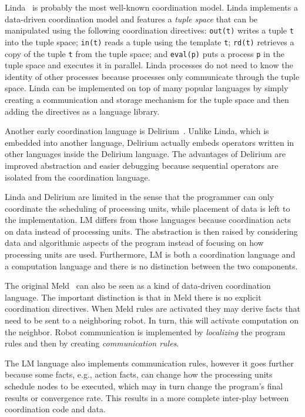 Linda~\cite{linda} is probably the most well-known coordination model. Linda
implements a data-driven coordination model and features a \emph{tuple space}
that can be manipulated using the following coordination directives:
\texttt{out(t)} writes a tuple \texttt{t} into the tuple space; \texttt{in(t)}
reads a tuple using the template \texttt{t}; \texttt{rd(t)} retrieves a copy of
the tuple \texttt{t} from the tuple space; and \texttt{eval(p)} puts a process
\texttt{p} in the tuple space and executes it in parallel.  Linda processes do
not need to know the identity of other processes because processes only
communicate through the tuple space.  Linda can be implemented on top of many
popular languages by simply creating a communication and storage mechanism for
the tuple space and then adding the directives as a language library.

Another early coordination language is Delirium~\cite{Delirium}. Unlike Linda,
which is embedded into another language, Delirium actually embeds operators
written in other languages inside the Delirium language. The advantages of
Delirium are improved abstraction and easier debugging because sequential
operators are isolated from the coordination language.

Linda and Delirium are limited in the sense that the programmer can only
coordinate the scheduling of processing units, while placement of data is left
to the implementation. LM differs from those languages because coordination acts
on data instead of processing units. The abstraction is then raised by
considering data and algorithmic aspects of the program instead of focusing on
how processing units are used. Furthermore, LM is both a coordination language
and a computation language and there is no distinction between the two
components.

The original Meld~\cite{ashley-rollman-iclp09} can also be seen as a kind of
data-driven coordination language. The important distinction is that in Meld
there is no explicit coordination directives. When Meld rules are activated they
may derive facts that need to be sent to a neighboring robot. In turn, this will
activate computation on the neighbor. Robot communication is implemented by
\emph{localizing} the program rules and then by creating \emph{communication
rules}.

The LM language also implements communication rules, however it goes further
because some facts, e.g., action facts, can change how the processing units
schedule nodes to be executed, which may in turn change the program's final
results or convergence rate. This results in a more complete inter-play between
coordination code and data.

